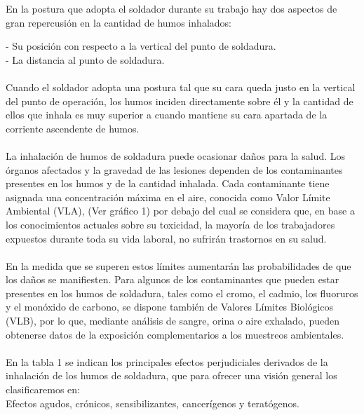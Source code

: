 \documentclass[12pt,letterpaper]{article}
\begin{document}
\begin{flushleft}
En la postura que adopta el soldador durante su trabajo hay dos aspectos de gran repercusión en la cantidad de humos inhalados:
\end{flushleft}
- Su posición con respecto a la vertical del punto de soldadura. 
\\
- La distancia al punto de soldadura.
\\\\
Cuando el soldador adopta una postura tal que su cara queda justo en la vertical del punto de operación, los humos inciden directamente sobre él y la cantidad de ellos que inhala es muy superior a cuando mantiene su cara apartada de la corriente ascendente de humos.
\\\\
La inhalación de humos de soldadura puede ocasionar daños para la salud. Los órganos afectados y la gravedad de las lesiones dependen de los contaminantes presentes en los humos y de la cantidad inhalada. 
Cada contaminante tiene asignada una concentración máxima en el aire, conocida como Valor Límite Ambiental (VLA), (Ver gráfico 1) por debajo del cual se considera que, en base a los conocimientos actuales sobre su toxicidad, la mayoría de los trabajadores expuestos durante toda su vida laboral, no sufrirán trastornos en su salud.
\\\\
En la medida que se superen estos límites aumentarán las probabilidades de que los daños se manifiesten. Para algunos de los contaminantes que pueden estar presentes en los humos de soldadura, tales como el cromo, el cadmio, los fluoruros y el monóxido de carbono, se dispone también de Valores Límites Biológicos (VLB), por lo que, mediante análisis de sangre, orina o aire exhalado, pueden obtenerse datos de la exposición complementarios a los muestreos ambientales. 
\\\\
En la tabla 1 se indican los principales efectos perjudiciales derivados de la inhalación de los humos de soldadura, que para ofrecer una visión general los clasificaremos en:
\\
Efectos agudos, crónicos, sensibilizantes, cancerígenos y teratógenos.
\end{document}
